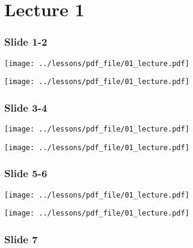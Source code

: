 \documentclass[../main/main.tex]{subfiles}
\begin{document}
\section{Lecture 1}


\subsubsection*{Slide 1-2}

\begin{minipage}[]{0.5\linewidth}
\centering
\texttt{[image: ../lessons/pdf\_file/01\_lecture.pdf]}
\end{minipage}
\begin{minipage}[]{0.5\linewidth}
\centering
\texttt{[image: ../lessons/pdf\_file/01\_lecture.pdf]}
\end{minipage}

\subsubsection*{Slide 3-4}

\begin{minipage}[]{0.5\linewidth}
\centering
\texttt{[image: ../lessons/pdf\_file/01\_lecture.pdf]}
\end{minipage}
\begin{minipage}[]{0.5\linewidth}
\centering
\texttt{[image: ../lessons/pdf\_file/01\_lecture.pdf]}
\end{minipage}

\subsubsection*{Slide 5-6}

\begin{minipage}[]{0.5\linewidth}
\centering
\texttt{[image: ../lessons/pdf\_file/01\_lecture.pdf]}
\end{minipage}
\begin{minipage}[]{0.5\linewidth}
\centering
\texttt{[image: ../lessons/pdf\_file/01\_lecture.pdf]}
\end{minipage}


\newpage

\subsubsection*{Slide 7}
\end{document}

